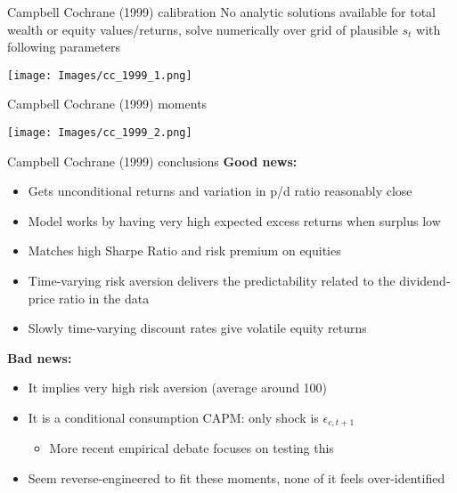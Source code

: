 \documentclass[xcolor=table, aspectratio=169]{beamer}
\newcommand{\alertbf}[1]{\alert{\textbf{#1}}}
\begin{document}

\begin{frame}{Campbell Cochrane (1999) calibration}
No analytic solutions available for total wealth or equity values/returns, solve numerically over grid of plausible $s_t$ with following parameters
\begin{center}
\texttt{[image: Images/cc\_1999\_1.png]}
\end{center}
\end{frame}

\begin{frame}{Campbell Cochrane (1999) moments}
\begin{center}
\texttt{[image: Images/cc\_1999\_2.png]}
\end{center}
\end{frame}

\begin{frame}{Campbell Cochrane (1999) conclusions}
\alertbf{Good news:}
\begin{itemize}
\item Gets unconditional returns and variation in p/d ratio reasonably close
\item Model works by having very high expected excess returns when surplus low
\item Matches high Sharpe Ratio and risk premium on equities
\item Time-varying risk aversion delivers the predictability related to the dividend-price ratio in the data
\item Slowly time-varying discount rates give volatile equity returns
\end{itemize}
\alertbf{Bad news:}
\begin{itemize}
\item It implies very high risk aversion (average around 100)
\item It is a conditional consumption CAPM: only shock is $\epsilon_{c,t+1}$
\begin{itemize}
\item More recent empirical debate focuses on testing this
\end{itemize}
\item Seem reverse-engineered to fit these moments, none of it feels over-identified
\end{itemize}
\end{frame}
\end{document}
